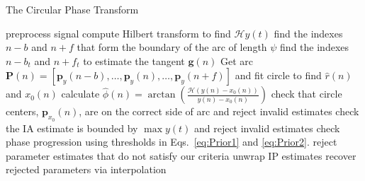 \documentclass[a4paper]{IEEEtran}
\begin{document}
% 

\begin{algorithm}
\caption{The Circular Phase Transform}\label{CPTAlgorithm}
\begin{algorithmic}[1]
\State preprocess signal
\State compute Hilbert transform to find $\mathcal{H}y(t)$
	\State find the indexes $n-b$ and $n+f$ that form the boundary of the arc of length $\psi$
	\State find the indexes $n-b_t$ and $n+f_t$ to estimate the tangent $\mathbf{g}(n)$
	\State Get arc $\mathbf{P}(n)=[\mathbf{p}_y(n-b),\hdots,\mathbf{p}_y(n),\hdots,\mathbf{p}_y(n+f)]$ and fit circle to find $\hat{r}(n)$ and $x_0(n)$
	\State calculate $\hat\phi(n)=\arctan\left(\frac{\mathcal{H}(y(n)-x_0(n))}{y(n)-x_0(n)}\right)$
\EndFor
\State check that circle centers, $\mathbf{p}_{x_0}(n)$, are on the correct side of arc and reject invalid estimates
\State check the IA estimate is bounded by $\max y(t)$ and reject invalid estimates
\State check phase progression using thresholds in Eqs.~\ref{eq:Prior1} and \ref{eq:Prior2}.
\State reject parameter estimates that do not satisfy our criteria
\State unwrap IP estimates
\State recover rejected parameters via interpolation 
\end{algorithmic}
\end{algorithm}	
\end{document}
